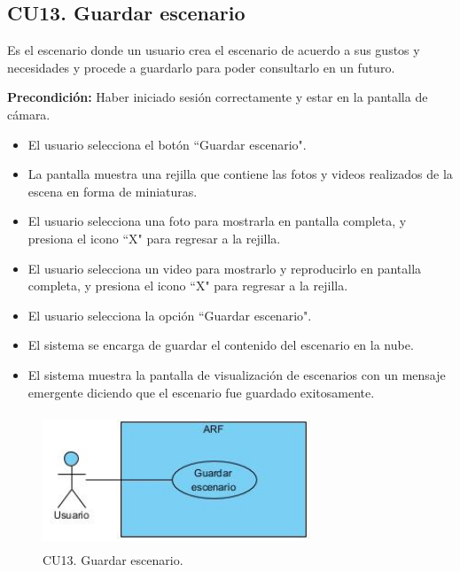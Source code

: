 \subsection{CU13. Guardar escenario}\par
Es el escenario donde un usuario crea el escenario de acuerdo a sus gustos y necesidades y procede a guardarlo para poder consultarlo en un futuro.\par
\textbf{Precondición:} Haber iniciado sesión correctamente y estar en la pantalla de cámara.\par
\begin{itemize}
	\item El usuario selecciona el botón ``Guardar escenario".
	\item La pantalla muestra una rejilla que contiene las fotos y videos realizados de la escena en forma de miniaturas.
	\item El usuario selecciona una foto para mostrarla en pantalla completa, y presiona el icono ``X" para regresar a la rejilla.
	\item El usuario selecciona un video para mostrarlo y reproducirlo en pantalla completa, y presiona el icono ``X" para regresar a la rejilla.
	\item El usuario selecciona la opción ``Guardar escenario".
	\item El sistema se encarga de guardar el contenido del escenario en la nube.
	\item El sistema muestra la pantalla de visualización de escenarios con un mensaje emergente diciendo que el escenario fue guardado exitosamente.
\end{itemize}

\begin{figure}[h!]
	\centering
	\includegraphics[width=8cm,height=4cm]{imagenes/analisis/cu/guardar_escenario.jpg}
	\caption{CU13. Guardar escenario.}
	\label{fig:guardarescenario}
\end{figure} 


